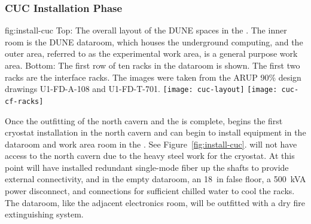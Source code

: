 \subsubsection{CUC Installation Phase}
\label{sec:fdsp-tc-inst-CUC}

\begin{dunefigure}{fig:install-cuc}
  {Top: The overall layout of the DUNE spaces in the . The inner room is the DUNE dataroom, which houses the underground computing, and the outer area, referred to as the experimental work area, is a general purpose work area. Bottom: The first row of ten racks in the dataroom is shown. The first two racks are the  interface racks. The images were taken from the ARUP 90\% design drawings U1-FD-A-108 and U1-FD-T-701.}
\texttt{[image: cuc-layout]}
\vspace{-2pt}
\texttt{[image: cuc-cf-racks]}
\end{dunefigure}

Once the   outfitting of the north cavern and the  is complete,   begins the first cryostat installation in the north cavern and  can begin to install equipment in the dataroom and work area room in the . See Figure~\ref{fig:install-cuc}.   will not have access to the north cavern due to the heavy steel work for the cryostat. 
At this point    will have installed redundant single-mode fiber up the shafts to provide external connectivity, and in the empty dataroom,  an \SI{18}{in} false floor, a \SI{500}{kVA} power disconnect, and connections for sufficient chilled water to cool the racks. The dataroom, like the adjacent  electronics room, will be outfitted with a dry fire extinguishing system. 
 

